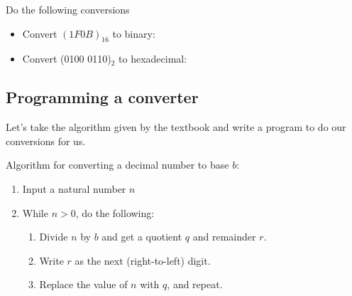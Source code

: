 \documentclass[a4paper,12pt]{book}
\newcounter{question}
\begin{document}
        \begin{questionNOGRADE}{\thequestion}
            Do the following conversions

            \begin{itemize}
                \item[a.]   Convert $(1F0B)_{16}$ to binary:

                \item[b.]   Convert (0100 0110)$_{2}$ to hexadecimal:
            \end{itemize}
        \end{questionNOGRADE}

    \newpage
    \subsection{Programming a converter}

        Let's take the algorithm given by the textbook and write
        a program to do our conversions for us.
    
            \begin{intro}{Algorithm for converting a decimal number to base $b$:}
                \begin{enumerate}
                    \item   Input a natural number $n$
                    \item   While $n > 0$, do the following:
                        \begin{enumerate}
                            \item   Divide $n$ by $b$ and get a quotient $q$ and remainder $r$.
                            \item   Write $r$ as the next (right-to-left) digit.
                            \item   Replace the value of $n$ with $q$, and repeat.
                        \end{enumerate}
                \end{enumerate}
            \end{intro}
\end{document}
